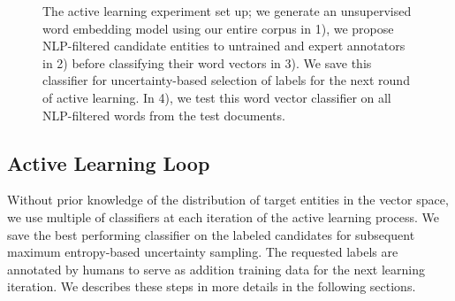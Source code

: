 \begin{figure}[!t]
\centering
{}
\caption{\label{fig:current} The active learning experiment set up; we generate an unsupervised word embedding model using our entire corpus in 1), we propose NLP-filtered candidate entities to untrained and expert annotators in 2) before classifying their word vectors in 3). We save this classifier for uncertainty-based selection of labels for the next round of active learning. In 4), we test this word vector classifier on all NLP-filtered words from the test documents. }
\end{figure}

\subsection{Active Learning Loop}
Without prior knowledge of the distribution of target entities in the vector space, we use multiple of classifiers at each iteration of the active learning process. 
We save the best performing classifier on the labeled candidates for subsequent maximum entropy-based uncertainty sampling. 
The requested labels are annotated by humans to serve as addition training data for the next learning iteration. 
We describes these steps in more details in the following sections.

